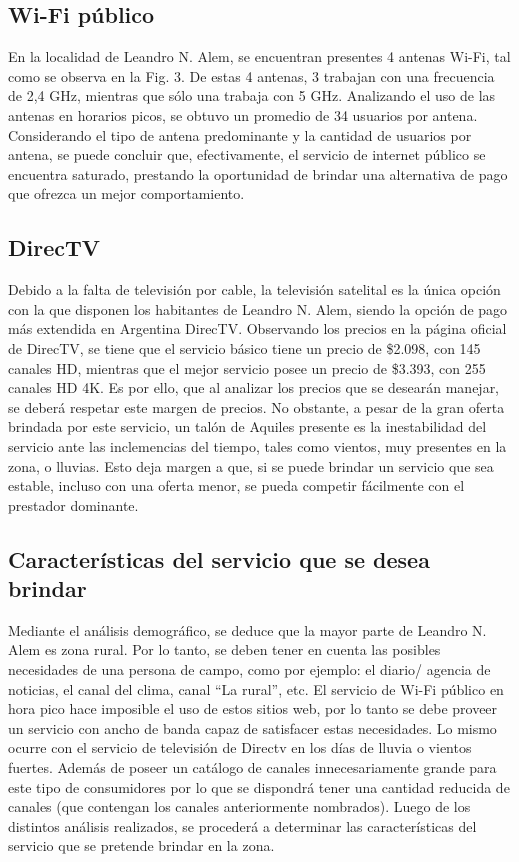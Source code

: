\documentclass[11pt,a4paper]{article}
\begin{document}
\subsection{Wi-Fi público}

En la localidad de Leandro N. Alem, se encuentran presentes 4 antenas Wi-Fi, tal como se observa en la Fig. 3.
De estas 4 antenas, 3 trabajan con una frecuencia de 2,4 GHz, mientras que sólo una trabaja con 5 GHz.
Analizando el uso de las antenas en horarios picos, se obtuvo un promedio de 34 usuarios por antena.
Considerando el tipo de antena predominante y la cantidad de usuarios por antena, se puede concluir que, efectivamente, el servicio de internet público se encuentra saturado, prestando la oportunidad de brindar una alternativa de pago que ofrezca un mejor comportamiento.

\subsection{DirecTV}

Debido a la falta de televisión por cable, la televisión satelital es la única opción con la que disponen los habitantes de Leandro N. Alem, siendo la opción de pago más extendida en Argentina DirecTV. 
Observando los precios en la página oficial de DirecTV, se tiene que el servicio básico tiene un precio de \$2.098, con 145 canales HD, mientras que el mejor servicio posee un precio de \$3.393, con 255 canales HD 4K.
Es por ello, que al analizar los precios que se desearán manejar, se deberá respetar este margen de precios.
No obstante, a pesar de la gran oferta brindada por este servicio, un talón de Aquiles presente es la inestabilidad del servicio ante las inclemencias del tiempo, tales como vientos, muy presentes en la zona, o lluvias.
Esto deja margen a que, si se puede brindar un servicio que sea estable, incluso con una oferta menor, se pueda competir fácilmente con el prestador dominante.

\subsection{Características del servicio que se desea brindar}

Mediante el análisis demográfico, se deduce que la mayor parte de Leandro N. Alem es zona rural.
Por lo tanto, se deben tener en cuenta las posibles necesidades de una persona de campo, como por ejemplo: el diario/ agencia de noticias, el canal del clima, canal “La rural”, etc. 
El servicio de Wi-Fi público en hora pico hace imposible el uso de estos sitios web, por lo tanto se debe proveer un servicio con ancho de banda capaz de satisfacer estas necesidades. 
Lo mismo ocurre con el servicio de televisión de Directv en los días de lluvia o vientos fuertes.
Además de poseer un catálogo de canales innecesariamente grande para este tipo de consumidores por lo que se dispondrá tener una cantidad reducida de canales (que contengan los canales anteriormente nombrados).
Luego de los distintos análisis realizados, se procederá a determinar las características del servicio que se pretende brindar en la zona.
\end{document}

